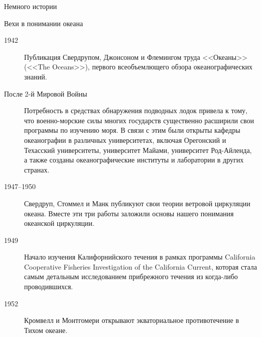 \begin{chapter}{Немного истории}
\begin{section}{Вехи в понимании океана}
\begin{description}
\item[1942] Публикация Свердрупом, Джонсоном и Флемингом труда
<<Океаны>> (<<The Oceans>>), первого всеобъемлющего обзора
океанографических знаний.
%


\item[После 2-й Мировой Войны] Потребность в средствах обнаружения 
подводных лодок привела к тому, что военно-морские силы многих государств 
существенно расширили свои программы по изучению моря. В связи с этим
были открыты кафедры океанографии в различных
университетах, включая Орегонский и Техасский университеты,
университет Майами, университет Род-Айленда, а также созданы 
океанографические институты и лаборатории в других странах.
%

\item[1947--1950] Свердруп, Стоммел и Манк публикуют свои теории
ветровой циркуляции океана. Вместе эти три работы заложили основы
нашего понимания океанской циркуляции.
%

\item[1949] Начало изучения Калифорнийского течения в рамках программы
California Cooperative Fisheries Investigation of the California
Current, которая стала самым детальным исследованием прибрежного течения
из когда-либо проводившихся.
%


\item[1952] Кромвелл и Монтгомери открывают экваториальное
противотечение в Тихом океане.
%



\end{description}
\end{section}
\end{chapter}
